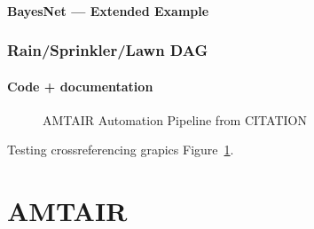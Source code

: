 \documentclass[
  letterpaper,
]{book}
\begin{document}
\subsubsection{BayesNet --- Extended
Example}\label{bayesnet-extended-example}

\subsection{Rain/Sprinkler/Lawn DAG}\label{rainsprinklerlawn-dag}

\subsubsection{Code + documentation}\label{code-documentation}

\begin{figure}


\caption[Five-step AMTAIR automation pipeline from PDFs to Bayesian
networks]{\label{fig-automation_pipeline}AMTAIR Automation Pipeline from
CITATION}

\end{figure}%

Testing crossreferencing grapics Figure~\ref{fig-automation_pipeline}.


\chapter{AMTAIR}\label{amtair}
\end{document}
